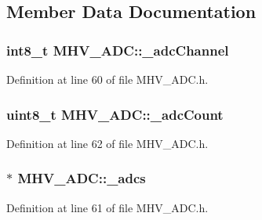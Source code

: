 \subsection{Member Data Documentation}
\hypertarget{class_m_h_v___a_d_c_ac37e4bbff5ab56cf804ccbdaa438dab3}{
\subsubsection[{\-\_\-adc\-Channel}]{\setlength{\rightskip}{0pt plus 5cm}int8\-\_\-t M\-H\-V\-\_\-\-A\-D\-C\-::\-\_\-adc\-Channel\hspace{0.3cm}{\ttfamily [protected]}}}\label{class_m_h_v___a_d_c_ac37e4bbff5ab56cf804ccbdaa438dab3}


Definition at line 60 of file M\-H\-V\-\_\-\-A\-D\-C.\-h.

\hypertarget{class_m_h_v___a_d_c_acfc87dc2be1e01a43b8cb0a1dbfde7e8}{
\subsubsection[{\-\_\-adc\-Count}]{\setlength{\rightskip}{0pt plus 5cm}uint8\-\_\-t M\-H\-V\-\_\-\-A\-D\-C\-::\-\_\-adc\-Count\hspace{0.3cm}{\ttfamily [protected]}}}\label{class_m_h_v___a_d_c_acfc87dc2be1e01a43b8cb0a1dbfde7e8}


Definition at line 62 of file M\-H\-V\-\_\-\-A\-D\-C.\-h.

\hypertarget{class_m_h_v___a_d_c_a6033f6790dd0a65e88d5a04fc01daaac}{
\subsubsection[{\-\_\-adcs}]{$\ast$ M\-H\-V\-\_\-\-A\-D\-C\-::\-\_\-adcs\hspace{0.3cm}{\ttfamily [protected]}}}\label{class_m_h_v___a_d_c_a6033f6790dd0a65e88d5a04fc01daaac}


Definition at line 61 of file M\-H\-V\-\_\-\-A\-D\-C.\-h.

